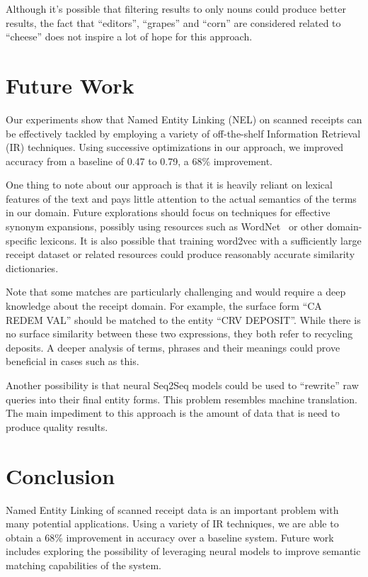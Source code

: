 \documentclass[11pt,a4paper]{article}
\begin{document}
Although it's possible that filtering results to only nouns could
produce better results, the fact that ``editors'', ``grapes'' and
``corn'' are considered related to ``cheese'' does not inspire a lot
of hope for this approach.

\section{Future Work}

Our experiments show that Named Entity Linking (NEL) on scanned
receipts can be effectively tackled by employing a variety of
off-the-shelf Information Retrieval (IR) techniques.  Using
successive optimizations in our approach, we improved accuracy from a
baseline of 0.47 to 0.79, a 68\% improvement.

One thing to note about our approach is that it is heavily reliant
on lexical features of the text and pays little attention to the
actual semantics of the terms in our domain.  Future explorations
should focus on techniques for effective synonym expansions,
possibly using resources such as WordNet~\cite{wordnet} or other
domain-specific lexicons.  It is also possible that training
word2vec with a sufficiently large receipt dataset or related
resources could produce reasonably accurate similarity dictionaries.

Note that some matches are particularly challenging and would
require a deep knowledge about the receipt domain.  For example,
the surface form ``CA REDEM VAL'' should be matched to the entity 
``CRV DEPOSIT''.  While there is no surface similarity between these
two expressions, they both refer to recycling deposits.  A deeper
analysis of terms, phrases and their meanings could prove beneficial
in cases such as this.

Another possibility is that neural Seq2Seq models could be used to
``rewrite'' raw queries into their final entity forms.  This problem
resembles machine translation.  The main impediment to this approach
is the amount of data that is need to produce quality results.

\section{Conclusion}
Named Entity Linking of scanned receipt data is an important problem
with many potential applications.  Using a variety of IR techniques,
we are able to obtain a 68\% improvement in accuracy over a baseline
system.   Future work includes exploring the possibility of leveraging
neural models to improve semantic matching capabilities of the system.



\end{document}
